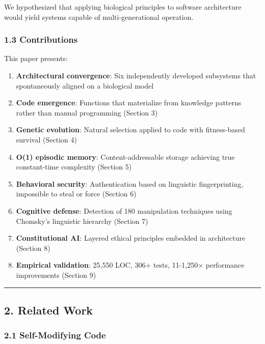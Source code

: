 \documentclass[
]{article}
\providecommand{\tightlist}{%
  \setlength{\itemsep}{0pt}\setlength{\parskip}{0pt}}
\begin{document}
We hypothesized that applying biological principles to software
architecture would yield systems capable of multi-generational
operation.

\subsubsection{1.3 Contributions}\label{contributions}

This paper presents:

\begin{enumerate}
\def\labelenumi{\arabic{enumi}.}
\tightlist
\item
  \textbf{Architectural convergence}: Six independently developed
  subsystems that spontaneously aligned on a biological model
\item
  \textbf{Code emergence}: Functions that materialize from knowledge
  patterns rather than manual programming (Section 3)
\item
  \textbf{Genetic evolution}: Natural selection applied to code with
  fitness-based survival (Section 4)
\item
  \textbf{O(1) episodic memory}: Content-addressable storage achieving
  true constant-time complexity (Section 5)
\item
  \textbf{Behavioral security}: Authentication based on linguistic
  fingerprinting, impossible to steal or force (Section 6)
\item
  \textbf{Cognitive defense}: Detection of 180 manipulation techniques
  using Chomsky's linguistic hierarchy (Section 7)
\item
  \textbf{Constitutional AI}: Layered ethical principles embedded in
  architecture (Section 8)
\item
  \textbf{Empirical validation}: 25,550 LOC, 306+ tests, 11-1,250×
  performance improvements (Section 9)
\end{enumerate}

\begin{center}\rule{0.5\linewidth}{0.5pt}\end{center}

\subsection{2. Related Work}\label{related-work}

\subsubsection{2.1 Self-Modifying Code}\label{self-modifying-code}
\end{document}
